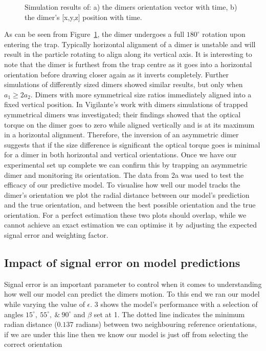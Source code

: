 \documentclass[final, 3p]{elsarticle}
\begin{document}
\begin{figure}[h]
\begin{subfigure}{0.45\textwidth}
		\subcaption{}
	\end{subfigure}
	\caption{Simulation results of: a) the dimers orientation vector with time, b) the dimer's [x,y,z] position with time.}
	\label{fig:motion}
\end{figure}

As can be seen from Figure~\ref{fig:motion}, the dimer undergoes a full $180^{\circ}$ rotation upon entering the trap. Typically horizontal alignment of a dimer is unstable and will result in the particle rotating to align along its vertical axis. It is interesting to note that the dimer is furthest from the trap centre as it goes into a horizontal orientation before drawing closer again as it inverts completely. Further simulations of differently sized dimers showed similar results, but only when $a_1 \geq 2a_2$. Dimers with more symmetrical size ratios immediately aligned into a fixed vertical position. 
In Vigilante's work with dimers \cite{Vigilante2020Brownian_OT} simulations of trapped symmetrical dimers was investigated; their findings showed that the optical torque on the dimer goes to zero while aligned vertically and is at its maximum in a horizontal alignment. Therefore, the inversion of an asymmetric dimer suggests that if the size difference is significant the optical torque goes is minimal for a dimer in both horizontal and vertical orientations. Once we have our experimental set up complete we can confirm this by trapping an asymmetric dimer and monitoring its orientation. The data from \figurename{ 2a} was used to test the efficacy of our predictive model. To visualise how well our model tracks the dimer's orientation we plot the radial distance between our model's prediction and the true orientation, and between the best possible orientation and the true orientation. For a perfect estimation these two plots should overlap, while we cannot achieve an exact estimation we can optimise it by adjusting the expected signal error and weighting factor. 

\subsection{Impact of signal error on model predictions}
\label{sec:3.2}
Signal error is an important parameter to control when it comes to understanding how well our model can predict the dimers motion. To this end we ran our model while varying the value of $\epsilon$. \figurename{ 3} shows the model's performance with a selection of angles $15^{\circ},\ 55^{\circ}, \ \& \ 90^{\circ}$ and $\beta$ set at 1. The dotted line indicates the minimum radian distance ($0.137$ radians) between two neighbouring reference orientations, if we are under this line then we know our model is just off from selecting the correct orientation
\end{document}
